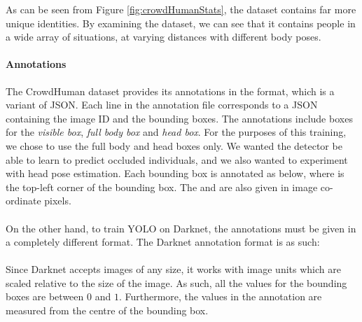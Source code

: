 As can be seen from Figure \ref{fig:crowdHumanStats}, the dataset contains far more unique identities. By examining the dataset, we can see that it contains people in a wide array of situations, at varying distances with different body poses.

\paragraph{Annotations} The CrowdHuman dataset provides its annotations in the  format, which is a variant of JSON. Each line in the annotation file corresponds to a JSON containing the image ID and the bounding boxes. The annotations include boxes for the \textit{visible box}, \textit{full body box} and \textit{head box}. For the purposes of this training, we chose to use the full body and head boxes only. We wanted the detector be able to learn to predict occluded individuals, and we also wanted to experiment with head pose estimation. Each bounding box is annotated as below, where  is the top-left corner of the bounding box. The  and  are also given in image co-ordinate pixels.

\paragraph{}  

\paragraph{}On the other hand, to train YOLO on Darknet, the annotations must be given in a completely different format. The Darknet annotation format is as such:

\paragraph{}

\paragraph{}Since Darknet accepts images of any size, it works with image units which are scaled relative to the size of the image. As such, all the values for the bounding boxes are between $0$ and $1$. Furthermore, the  values in the annotation are measured from the centre of the bounding box.  

